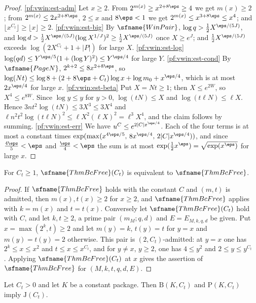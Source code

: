 \begin{proof}
\ref{pf:vwin:est-adm} Let $x\ge2$. From $2^{m(x)}\ge x^{2+8\eps}\ge4$ we get $m(x)\ge2$; from $2^{m(x)}\le2x^{2+8\eps}$, $2\le x$ and
$8\eps<1$ we get $2^{m(x)}\le x^{3+8\eps}\le x^4$; and $\lfloor x^{C_t}\rfloor\ge\lfloor x\rfloor\ge2$.
\ref{pf:vwin:est-big} By $\sfname{WinPair}$, $\log q>\frac12X^{\eps/(5J)}$, and $\log d>\frac12X^{\eps/(5J)}(\log X^{1/J})^2\ge\frac12
X^{\eps/(5J)}$ once $X\ge e^J$; and $\frac12X^{\eps/(5J)}$ exceeds $\log(2X^{C_t}+1+|P|)$ for large $X$.
\ref{pf:vwin:est-log} $\log(qd)\le Y^{\eps/5}(1+(\log Y)^2)\le Y^{\eps/4}$ for large $Y$.
\ref{pf:vwin:est-cond} By $\sfname{PageN}$, $2^{k+2}\le8x^{2+8\eps}$, so $\log(Nt)\le\log8+(2+8\eps+C_t)\log x+\log m_0+x^{\eps/4}$, which is
at most $2x^{\eps/4}$ for large $x$.
\ref{pf:vwin:est-beta} Put $X=Nt\ge1$; then $X\le e^{2W}$, so $X^4\le e^{8W}$. Since $\log y\le y$ for $y>0$, $\log(tN)\le X$ and
$\log(t\ell N)\le\ell X$. Hence $3nt^2\log(tN)\le3X^3\le3X^4$ and $\ell n^2t^2\log(t\ell N)^2\le\ell X^2(\ell X)^2=\ell^3X^4$, and the
claim follows by summing.
\ref{pf:vwin:est-err} We have $u^C\le e^{2|C|x^{\eps/4}}$. Each of the four terms is at most a constant times
$\exp(\max(x^{4\eps/5},\,8x^{\eps/4},\,2|C|x^{\eps/4}))$, and since $\frac{4\eps}5<\eps$ and $\frac\eps4<\eps$ the sum is at most
$\exp(\frac12x^\eps)=\sqrt{\exp(x^\eps)}$ for large $x$.
\end{proof}

\begin{lemma}\label{pf:vwin:bciff}
For $C_t\ge1$, $\sfname{ThmBcFree}(C_t)$ is equivalent to $\sfname{ThmBcFree}$.
\end{lemma}

\begin{proof}
If $\sfname{ThmBcFree}$ holds with the constant $C$ and $(m,t)$ is admitted, then $m(x),t(x)\ge2$ for $x\ge2$, and
$\sfname{ThmBcFree}$ applies with $k=m(x)$ and $t=t(x)$. Conversely let $\sfname{ThmBcFree}(C_t)$ hold with $C$, and let
$k,t\ge2$, a prime pair $(m_M;q,d)$ and $E=E_{M,k,q,d}$ be given. Put $x=\max(2^k,t)\ge2$ and let $m(y)=k$, $t(y)=t$ for
$y=x$ and $m(y)=t(y)=2$ otherwise. This pair is $(2,C_t)$-admitted: at $y=x$ one has $2^k\le x\le x^2$ and $t\le x\le x^{C_t}$,
and for $y\ne x$, $y\ge2$, one has $4\le y^2$ and $2\le y\le y^{C_t}$. Applying $\sfname{ThmBcFree}(C_t)$ at $x$ gives the
assertion of $\sfname{ThmBcFree}$ for $(M,k,t,q,d,E)$.
\end{proof}

\begin{lemma}\label{pf:vwin:jointof}
Let $C_t>0$ and let $K$ be a constant package. Then $\mathrm{B}(K,C_t)$ and $\mathrm{P}(K,C_t)$ imply $\mathrm{J}(C_t)$.
\end{lemma}

